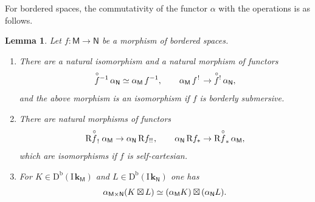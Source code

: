 \documentclass[11pt]{article}
\numberwithin{equation}{section}
\newenvironment{enumeratei}
{\bgroup\def\theenumi{\roman{enumi}}\def\theenumii{\alph{enumii}}\begin{enumerate}}
{\end{enumerate}\egroup}
\newcommand{\accentset}[2]{\overset{#1}{#2}}
\theoremstyle{plain}
\newtheorem{lemma}[theorem]{Lemma}
\theoremstyle{definition}
\newcommand{\derived}[1]{\mathrm{#1}}
\newcommand{\derd}{\derived{D}}
\newcommand{\derr}{\derived{R}}
\newcommand{\BDC}{\derd^{\mathrm{b}}}
\newcommand{\roim}[1]{\derr#1_*}
\newcommand{\reim}[1]{\derr#1_{\mspace{.5mu}!}\mspace{2mu}}
\newcommand{\reeim}[1]{\derr#1_{\mspace{1mu}!!}\mspace{1mu}}
\newcommand{\epb}[1]{#1^{\mspace{1.5mu}!}\mspace{2mu}}
\newcommand{\etens}[1][]{\mathbin{\boxtimes_{\raise1.5ex\hbox to-.1em{}#1}}}
\newcommand{\field}{\mathbf{k}}\let\cor\field
\newcommand{\ind}{\mathrm{I}\mspace{2mu}}
\newcommand{\ifield}{\ind\field}
\newcommand{\unbordered}[1]{{\accentset{\circ}{#1}}}
\let\oo \unbordered
\newcommand{\bbM}{\mathsf{M}}
\newcommand{\bbN}{\mathsf{N}}
\newcommand{\opb}[1]{#1^{-1}}
\begin{document}
For bordered spaces, the commutativity of the functor $\alpha$ with the operations is as follows.

\begin{lemma}\label{lem:alphaop}
Let $f\colon\bbM\to\bbN$ be a morphism of bordered spaces.
\begin{enumeratei}
\item\label{lem:alphaopi}
There are a natural isomorphism and a natural morphism of functors
\[
\oo f{}^{-1} \, \alpha_{\bbN} \simeq \alpha_{\bbM} \, \opb f , \qquad
\alpha_{\bbM} \, \epb f \to \oo f{}^! \, \alpha_{\bbN} ,
\]
and the above morphism is an isomorphism if $f$ is borderly submersive.
\item\label{lem:alphaopii}
There are natural morphisms of functors
\[
\reim {\oo f} \, \alpha_{\bbM} \to \alpha_{\bbN} \, \reeim f, \qquad
\alpha_{\bbN} \, \roim f \to \roim {\oo f} \, \alpha_{\bbM},
\]
which are isomorphisms if $f$ is self-cartesian.
\item\label{lem:alphaopiii}
For $K\in\BDC(\ifield_\bbM)$ and $L\in\BDC(\ifield_\bbN)$ one has
\[
\alpha_{\bbM\times\bbN}(K\etens L) \simeq (\alpha_\bbM K)\etens(\alpha_\bbN L).
\]
\end{enumeratei}
\end{lemma}
\end{document}
